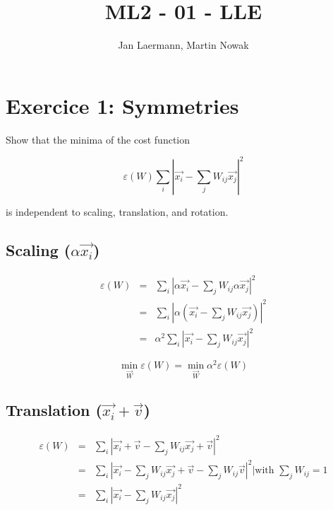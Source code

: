 \documentclass{article}
\begin{document}
\title{ML2 - 01 - LLE}
\author{Jan Laermann, Martin Nowak}
\maketitle

\section{Exercice 1: Symmetries}

Show that the minima of the cost function

\begin{equation*}
  \varepsilon(W) \sum_i |\vec{x_i} - \sum_j W_{ij} \vec{x_j}|^2
\end{equation*}

is independent to scaling, translation, and rotation.

\subsection{Scaling ($\alpha\vec{x_i}$)}

  \begin{eqnarray*}
    \varepsilon(W) &=& \sum_i |\alpha \vec{x_i} - \sum_j W_{ij} \alpha \vec{x_j}|^2\\
    &=& \sum_i |\alpha (\vec{x_i} - \sum_j W_{ij} \vec{x_j})|^2\\
    &=& \alpha^2 \sum_i |\vec{x_i} - \sum_j W_{ij} \vec{x_j}|^2
  \end{eqnarray*}

  \begin{equation*}
    \min_{\vec{W}} \varepsilon(W) = \min_{\vec{W}} \alpha^2 \varepsilon(W)
  \end{equation*}

\subsection{Translation ($\vec{x_i} + \vec{v}$)}

  \begin{eqnarray*}
    \varepsilon(W) &=& \sum_i |\vec{x_i} + \vec{v} - \sum_j W_{ij} \vec{x_j} + \vec{v}|^2\\
    &=& \sum_i |\vec{x_i} - \sum_j W_{ij} \vec{x_j} + \vec{v} - \sum_j W_{ij} \vec{v}|^2 \Big\vert \text{with } \sum_j W_{ij} = 1 \\
    &=& \sum_i |\vec{x_i} - \sum_j W_{ij} \vec{x_j}|^2\\
  \end{eqnarray*}
\end{document}
